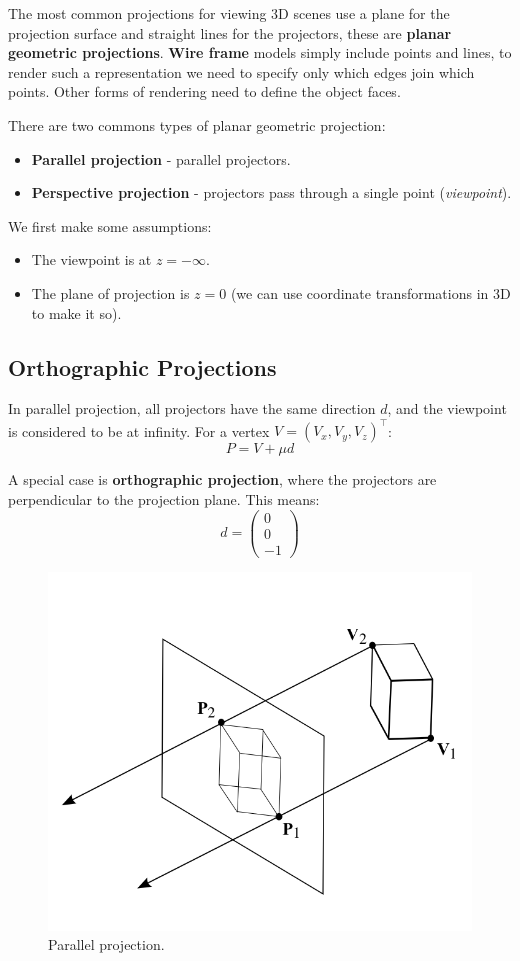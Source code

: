 \documentclass[11pt]{article}
\begin{document}
The most common projections for viewing 3D scenes use a plane for the projection surface and straight lines for the projectors, these are \textbf{planar geometric projections}.
\textbf{Wire frame} models simply include points and lines, to render such a representation we need to specify only which edges join which points.
Other forms of rendering need to define the object faces.

There are two commons types of planar geometric projection:
\begin{itemize}
  \item \textbf{Parallel projection} - parallel projectors.
  \item \textbf{Perspective projection} - projectors pass through a single point (\textit{viewpoint}).
\end{itemize}

We first make some assumptions:
\begin{itemize}
  \item The viewpoint is at $z = - \infty$.
  \item The plane of projection is $z = 0$ (we can use coordinate transformations in 3D to make it so).
\end{itemize}

\subsection{Orthographic Projections}
In parallel projection, all projectors have the same direction $d$, and the viewpoint is considered to be at infinity.
For a vertex $V = (V_x, V_y, V_z)^\intercal$:
\[
  P = V + \mu d
\]

A special case is \textbf{orthographic projection}, where the projectors are perpendicular to the projection plane.
This means:
\[
  d = 
  \begin{pmatrix}
    0 \\
    0 \\
    -1
  \end{pmatrix}
\]

\begin{figure}[h]
  \caption{Parallel projection.}
  \includegraphics[scale=0.3]{parallel}
  \centering
\end{figure}
\end{document}
